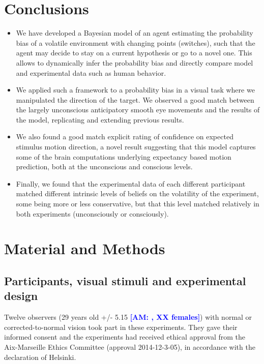 \documentclass[12pt,english]{article}%
\newcommand{\AM}[1]{\textbf{\textcolor{blue}{[AM: #1]}}}
\begin{document}
\section{Conclusions}
\begin{itemize}\setlength{\itemsep}{0ex}
\item We have developed a Bayesian model of an agent estimating the probability bias of a volatile environment with changing points (switches), such that the agent may decide to stay on a current hypothesis or go to a novel one. This allows to dynamically infer the probability bias and directly compare model and experimental data such as human behavior.
\item We applied such a framework to a probability bias in a visual task where we manipulated the direction of the target. We observed a good match between the largely unconscious anticipatory smooth eye movements and the results of the model, replicating and extending previous results.
\item We also found a good match explicit rating of confidence on expected stimulus motion direction, a novel result suggesting that this model captures some of the brain computations underlying expectancy based motion prediction, both at the unconscious and conscious levels.
\item Finally, we found that the experimental data of each different participant matched different intrinsic levels of beliefs on the volatility of the experiment, some being more or less conservative, but that this level matched relatively in both experiments (unconsciously or consciously). 
\end{itemize}
\section{Material and Methods}
\subsection{Participants, visual stimuli and experimental design}
Twelve observers (29 years old +/- 5.15 \AM{, XX females}) with normal or corrected-to-normal vision took part in these experiments. They gave their informed consent and the experiments had received ethical approval from the Aix-Marseille Ethics Committee (approval 2014-12-3-05), in accordance with the declaration of Helsinki.
\end{document}
